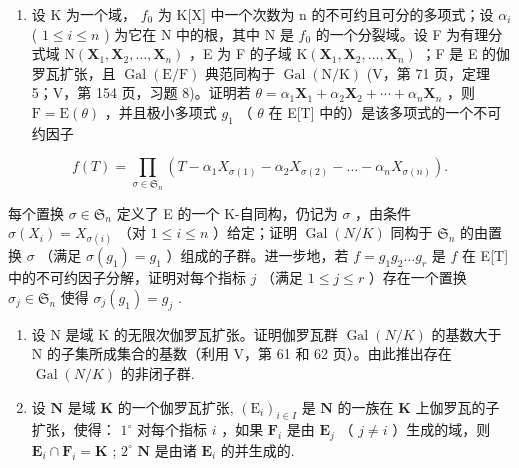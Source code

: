 \begin{enumerate}
\def\labelenumi{\arabic{enumi})}
\setcounter{enumi}{1}
\tightlist
\item
  设 K 为一个域， \(f_{0}\) 为 K{[}X{]} 中一个次数为 n 的不可约且可分的多项式；设 \(\alpha_{i}\) ( \(1 \leqslant i \leqslant n\) ) 为它在 N 中的根，其中 N 是 \(f_{0}\) 的一个分裂域。设 F 为有理分式域 \(\mathrm{N}(\mathbf{X}_{1}, \mathbf{X}_{2}, \ldots, \mathbf{X}_{n})\) ，E 为 F 的子域 \(\mathrm{K}(\mathbf{X}_{1}, \mathbf{X}_{2}, \ldots, \mathbf{X}_{n})\) ；F 是 E 的伽罗瓦扩张，且 \(\operatorname{Gal}(\mathrm{E}/\mathrm{F})\) 典范同构于 \(\operatorname{Gal}(\mathrm{N}/\mathrm{K})\) (V，第 71 页，定理 5；V，第 154 页，习题 8)。证明若 \(\theta = \alpha_{1}\mathbf{X}_{1} + \alpha_{2}\mathbf{X}_{2} + \cdots + \alpha_{n}\mathbf{X}_{n}\) ，则 \(\mathrm{F} = \mathrm{E}(\theta)\) ，并且极小多项式 \(g_{1}\) （ \(\theta\) 在 E{[}T{]} 中的）是该多项式的一个不可约因子
\end{enumerate}

\[
f (T) = \prod_ {\sigma \in \mathfrak {S} _ {n}} \left(T - \alpha_ {1} X _ {\sigma (1)} - \alpha_ {2} X _ {\sigma (2)} - \dots - \alpha_ {n} X _ {\sigma (n)}\right).
\]

每个置换 \(\sigma \in \mathfrak{S}_n\) 定义了 E 的一个 K-自同构，仍记为 \(\sigma\) ，由条件 \(\sigma(X_i) = X_{\sigma(i)}\) （对 \(1 \leqslant i \leqslant n\) ）给定；证明 \(\operatorname{Gal}(N/K)\) 同构于 \(\mathfrak{S}_n\) 的由置换 \(\sigma\) （满足 \(\sigma(g_1) = g_1\) ）组成的子群。进一步地，若 \(f = g_1g_2 \ldots g_r\) 是 \(f\) 在 E{[}T{]} 中的不可约因子分解，证明对每个指标 \(j\) （满足 \(1 \leqslant j \leqslant r\) ）存在一个置换 \(\sigma_j \in \mathfrak{S}_n\) 使得 \(\sigma_j(g_1) = g_j\) .

\begin{enumerate}
\def\labelenumi{\arabic{enumi})}
\setcounter{enumi}{2}
\item
  设 N 是域 K 的无限次伽罗瓦扩张。证明伽罗瓦群 \(\operatorname{Gal}(N/K)\) 的基数大于 N 的子集所成集合的基数（利用 V，第 61 和 62 页）。由此推出存在 \(\operatorname{Gal}(N/K)\) 的非闭子群.
\item
  设 \(\mathbf{N}\) 是域 \(\mathbf{K}\) 的一个伽罗瓦扩张, \((\mathrm{E}_i)_{i\in I}\) 是 \(\mathbf{N}\) 的一族在 \(\mathbf{K}\) 上伽罗瓦的子扩张，使得： \(1^{\circ}\) 对每个指标 \(i\) ，如果 \(\mathbf{F}_i\) 是由 \(\mathbf{E}_j\) （ \(j\neq i\) ）生成的域，则 \(\mathbf{E}_i\cap \mathbf{F}_i = \mathbf{K}\) ; \(2^{\circ}\) \(\mathbf{N}\) 是由诸 \(\mathbf{E}_i\) 的并生成的.
\end{enumerate}

